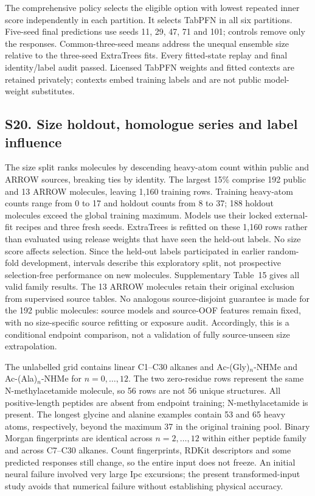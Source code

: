 The comprehensive policy selects the eligible option with lowest repeated inner
score independently in each partition. It selects TabPFN in all six partitions.
Five-seed final predictions use seeds 11, 29, 47, 71 and 101; controls remove only
the responses. Common-three-seed means address the unequal ensemble size relative
to the three-seed ExtraTrees fits. Every fitted-state replay and final identity/label
audit passed. Licensed TabPFN weights and fitted contexts are retained privately;
contexts embed training labels and are not public model-weight substitutes.

\subsection*{S20. Size holdout, homologue series and label influence}

The size split ranks molecules by descending heavy-atom count within public and
ARROW sources, breaking ties by identity. The largest 15\% comprise 192 public
and 13 ARROW molecules, leaving 1,160 training rows. Training heavy-atom counts
range from 0 to 17 and holdout counts from 8 to 37; 188 holdout molecules exceed
the global training maximum. Models use their locked external-fit recipes and
three fresh seeds. ExtraTrees is refitted on these 1,160 rows rather than evaluated
using release weights that have seen the held-out labels. No size score affects
selection. Since the held-out labels participated in earlier random-fold
development, intervals describe this exploratory split, not prospective selection-free
performance on new molecules. Supplementary Table~15 gives all valid family results.
The 13 ARROW molecules retain their original exclusion from supervised source
tables. No analogous source-disjoint guarantee is made for the 192 public molecules:
source models and source-OOF features remain fixed, with no size-specific source
refitting or exposure audit. Accordingly, this is a conditional endpoint comparison,
not a validation of fully source-unseen size extrapolation.

The unlabelled grid contains linear C1--C30 alkanes and Ac-(Gly)$_n$-NHMe and
Ac-(Ala)$_n$-NHMe for $n=0,\ldots,12$. The two zero-residue rows represent the
same N-methylacetamide molecule, so 56 rows are not 56 unique structures. All
positive-length peptides are absent from endpoint training; N-methylacetamide is
present. The longest glycine and alanine examples contain 53 and 65 heavy atoms,
respectively, beyond the maximum 37 in the original training pool. Binary Morgan
fingerprints are identical across $n=2,\ldots,12$ within either peptide family and
across C7--C30 alkanes. Count fingerprints, RDKit descriptors and some predicted
responses still change, so the entire input does not freeze. An initial neural
failure involved very large Ipc excursions; the present transformed-input study
avoids that numerical failure without establishing physical accuracy.

